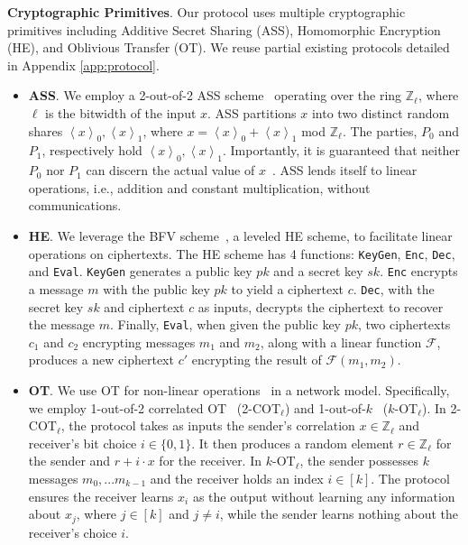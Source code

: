 \noindent\textbf{Cryptographic Primitives}. Our protocol uses multiple cryptographic primitives including Additive Secret Sharing (ASS), Homomorphic Encryption (HE), and Oblivious Transfer (OT). We reuse partial existing protocols detailed in Appendix \ref{app:protocol}.
\begin{itemize}[leftmargin=*, nosep, topsep=0pt, partopsep=0pt]

\item \textbf{ASS}. We employ a 2-out-of-2 ASS scheme~\citep{cramer2015ass} operating over the ring $\mathbb{Z}_{\ell}$, where $\ell$ is the bitwidth of the input $x$. ASS partitions $x$ into two distinct random shares $\left \langle x \right \rangle_{0}, \left \langle x \right \rangle_{1}$, where $x = \left \langle x \right \rangle_{0} + \left \langle x \right \rangle_{1}$ mod $\mathbb{Z}_{\ell}$. The parties, $P_0$ and $P_1$, respectively hold $\left \langle x \right \rangle_{0}, \left \langle x \right \rangle_{1}$. Importantly, it is guaranteed that neither $P_0$ nor $P_1$ can discern the actual value of $x$~\citep{cramer2015ass}. ASS lends itself to linear operations, i.e., addition and constant multiplication, without communications.
\item \textbf{HE}. We leverage the BFV scheme~\citep{brakerski2012fv, fan2012fv,deng2024trinity}, a leveled HE scheme, to facilitate linear operations on ciphertexts. The HE scheme has 4 functions: \texttt{KeyGen}, \texttt{Enc}, \texttt{Dec}, and \texttt{Eval}. \texttt{KeyGen} generates a public key $pk$ and a secret key $sk$. \texttt{Enc} encrypts a message $m$ with the public key $pk$ to yield a ciphertext $c$. \texttt{Dec}, with the secret key $sk$ and ciphertext $c$ as inputs, decrypts the ciphertext to recover the message $m$. Finally, \texttt{Eval}, when given the public key $pk$, two ciphertexts $c_1$ and $c_2$ encrypting messages $m_1$ and $m_2$, along with a linear function $\mathcal{F}$, produces a new ciphertext $c'$ encrypting the result of $\mathcal{F}(m_1, m_2)$. 


\item \textbf{OT}. We use OT for non-linear operations~\citep{rathee2020cryptflow2, rathee2021sirnn, xue2023cryptotrain} in a network model. Specifically, we employ 1-out-of-2 correlated OT~\citep{asharov2013ot2} (2-COT$_{\ell}$) and 1-out-of-$k$~\citep{kolesnikov2013otk} ($k$-OT$_{\ell}$). In 2-COT$_{\ell}$, the protocol takes as inputs the sender's correlation $x \in \mathbb{Z}_{\ell}$ and receiver's bit choice $i \in \{0,1\}$. It then produces a random element $r \in \mathbb{Z}_{\ell}$ for the sender and $r + i \cdot x$ for the receiver. In $k$-OT$_{\ell}$, the sender possesses $k$ messages $m_0,...m_{k-1}$ and the receiver holds an index $i \in [k]$. The protocol ensures the receiver learns $x_i$ as the output without learning any information about $x_j$, where $j\in [k]$ and $j\ne i$, while the sender learns nothing about the receiver's choice $i$. 
\end{itemize}


